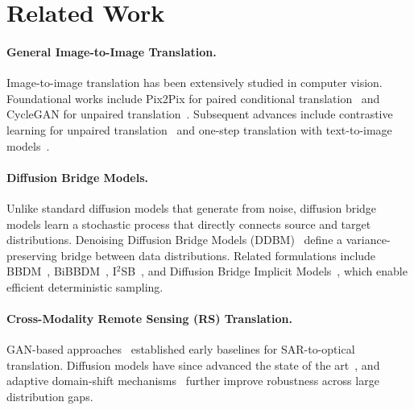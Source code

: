 \section{Related Work}
\label{sec:related_work}

\paragraph{General Image-to-Image Translation.}
Image-to-image translation has been extensively studied in computer vision. Foundational works include Pix2Pix for paired conditional translation~\cite{isolaImageToImageTranslationConditional2017} and CycleGAN for unpaired translation~\cite{zhuUnpairedImageToImageTranslation2017}. Subsequent advances include contrastive learning for unpaired translation~\cite{parkContrastiveLearningUnpaired2020} and one-step translation with text-to-image models~\cite{parmarOneStepImageTranslation2024}.

\paragraph{Diffusion Bridge Models.}
Unlike standard diffusion models that generate from noise, diffusion bridge models learn a stochastic process that directly connects source and target distributions. Denoising Diffusion Bridge Models (DDBM)~\cite{zhouDenoisingDiffusionBridge2024} define a variance-preserving bridge between data distributions. Related formulations include BBDM~\cite{Li_2023_CVPR}, BiBBDM~\cite{xueBiBBDMBidirectionalImage2025}, I$^2$SB~\cite{liuI2SBImagetoImageSchrodinger2023}, and Diffusion Bridge Implicit Models~\cite{zhengDiffusionBridgeImplicit2025}, which enable efficient deterministic sampling.

\paragraph{Cross-Modality Remote Sensing (RS) Translation.}
GAN-based approaches~\cite{wangSARtoOpticalImageTranslation2022,huGanbasedSAROptical2022} established early baselines for SAR-to-optical translation. Diffusion models have since advanced the state of the art~\cite{qinConditionalDiffusionModel2024,qinEfficientEndtoEndDiffusion2025}, and adaptive domain-shift mechanisms~\cite{wangAdaptiveDomainShift2026a} further improve robustness across large distribution gaps.
